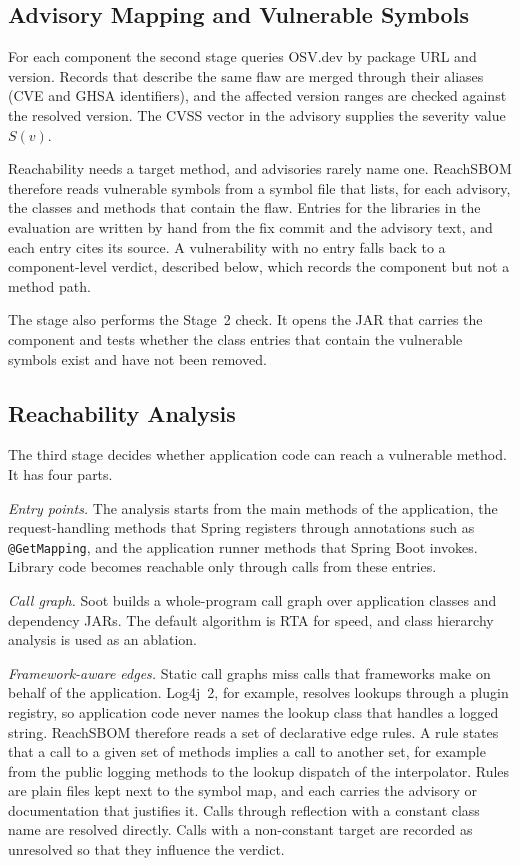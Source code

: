 \documentclass[conference]{IEEEtran}
\begin{document}
\subsection{Advisory Mapping and Vulnerable Symbols}
For each component the second stage queries OSV.dev by package URL and version. Records that describe the same flaw are merged through their aliases (CVE and GHSA identifiers), and the affected version ranges are checked against the resolved version. The CVSS vector in the advisory supplies the severity value $S(v)$.

Reachability needs a target method, and advisories rarely name one. ReachSBOM therefore reads vulnerable symbols from a symbol file that lists, for each advisory, the classes and methods that contain the flaw. Entries for the libraries in the evaluation are written by hand from the fix commit and the advisory text, and each entry cites its source. A vulnerability with no entry falls back to a component-level verdict, described below, which records the component but not a method path.

The stage also performs the Stage~2 check. It opens the JAR that carries the component and tests whether the class entries that contain the vulnerable symbols exist and have not been removed.

\subsection{Reachability Analysis}
The third stage decides whether application code can reach a vulnerable method. It has four parts.

\emph{Entry points.} The analysis starts from the main methods of the application, the request-handling methods that Spring registers through annotations such as \texttt{@GetMapping}, and the application runner methods that Spring Boot invokes. Library code becomes reachable only through calls from these entries.

\emph{Call graph.} Soot builds a whole-program call graph over application classes and dependency JARs. The default algorithm is RTA for speed, and class hierarchy analysis is used as an ablation.

\emph{Framework-aware edges.} Static call graphs miss calls that frameworks make on behalf of the application. Log4j~2, for example, resolves lookups through a plugin registry, so application code never names the lookup class that handles a logged string. ReachSBOM therefore reads a set of declarative edge rules. A rule states that a call to a given set of methods implies a call to another set, for example from the public logging methods to the lookup dispatch of the interpolator. Rules are plain files kept next to the symbol map, and each carries the advisory or documentation that justifies it. Calls through reflection with a constant class name are resolved directly. Calls with a non-constant target are recorded as unresolved so that they influence the verdict.
\end{document}
